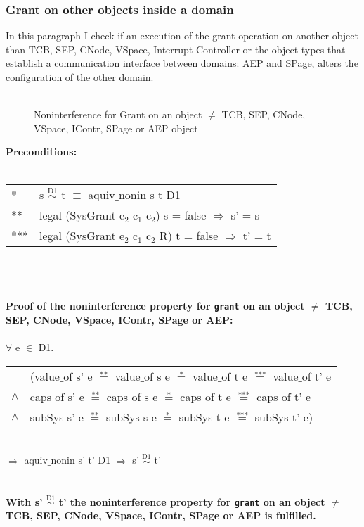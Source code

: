 \subsubsection{Grant on other objects inside a domain} 
In this paragraph I check if an execution of the grant operation on another object than TCB, SEP, CNode, VSpace, Interrupt Controller or the object types that establish a communication interface between domains: AEP and SPage, alters the configuration of the other domain. \\ \\
\begin{flushleft}
\begin{figure}[H]
\caption{Noninterference for Grant on an object $\neq$ TCB, SEP, CNode, VSpace, IContr, SPage or AEP object}
\end{figure}
\end{flushleft}
\textbf{Preconditions:} \\ \\
\begin{tabular}{ll}
* & s $\overset{\text{D1}}{\sim}$ t $\equiv$ aquiv$\_$nonin s t D1	\\ 
** & legal (SysGrant e$_2$ c$_1$ c$_2$) s = false $\Rightarrow$ s' = s \\ 
*** & legal (SysGrant e$_2$ c$_1$ c$_2$ R) t = false $\Rightarrow$ t' = t
\end{tabular}\\ \\ \\
\textbf{Proof of the noninterference property for \texttt{grant} on an object $\neq$ TCB, SEP, CNode, VSpace, IContr, SPage or AEP:}\\ \\
$\forall$ e $\in$ D1. \\ 
\begin{tabular}{ll}
& (value$\_$of s' e $\overset{\text{**}}{=}$ value$\_$of s e $\overset{\text{*}}{=}$ value$\_$of t e $\overset{\text{***}}{=}$ value$\_$of t' e \\
$\wedge$ & caps$\_$of s' e $\overset{\text{**}}{=}$ caps$\_$of s e $\overset{\text{*}}{=}$ caps$\_$of t e $\overset{\text{***}}{=}$ caps$\_$of t' e \\
$\wedge$ & subSys s' e $\overset{\text{**}}{=}$ subSys s e $\overset{\text{*}}{=}$ subSys t e $\overset{\text{***}}{=}$ subSys t' e)
\end{tabular} \\
$\Rightarrow$ aquiv$\_$nonin s' t' D1 $\Rightarrow$ s' $\overset{\text{D1}}{\sim}$ t' \\ \\ \\
\textbf{With s' $\overset{\text{D1}}{\sim}$ t' the noninterference property for \texttt{grant} on an object $\neq$ TCB, SEP, CNode, VSpace, IContr, SPage or AEP is fulfilled.} 
\clearpage
